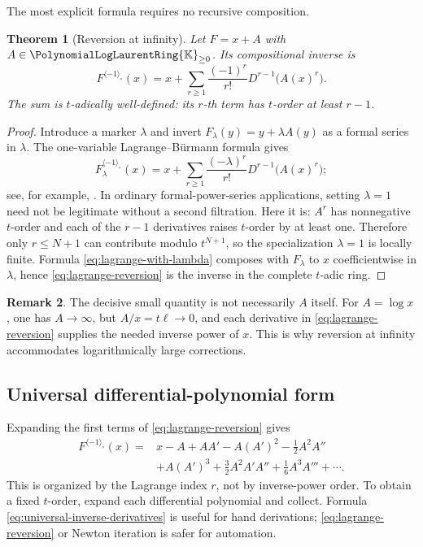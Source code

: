 \documentclass[11pt,oneside]{article}
\numberwithin{equation}{section}
\newtheorem{theorem}{Theorem}[section]
\theoremstyle{definition}
\newtheorem{remark}[theorem]{Remark}
\newcommand{\K}{\mathbb{K}}
\newcommand{\PL}{\PolynomialLogLaurentRing{\K}}
\newcommand{\rev}{\langle-1\rangle_{\circ}}
\begin{document}
The most explicit formula requires no recursive composition.

\begin{theorem}[Reversion at infinity]\label{thm:lagrange-reversion}
Let \(F=x+A\) with \(A\in{\PL}_{\ge0}\).  Its compositional inverse is
\begin{equation}\label{eq:lagrange-reversion}
\boxed{
  F^{\rev}(x)
  =x+\sum_{r\ge1}\frac{(-1)^r}{r!}
       D^{r-1}\bigl(A(x)^r\bigr).
}
\end{equation}
The sum is \(t\)-adically well-defined: its \(r\)-th term has
\(t\)-order at least \(r-1\).
\end{theorem}

\begin{proof}
Introduce a marker \(\lambda\) and invert
\(F_\lambda(y)=y+\lambda A(y)\) as a formal series in \(\lambda\).  The
one-variable Lagrange--B\"urmann formula gives
\begin{equation}\label{eq:lagrange-with-lambda}
  F_\lambda^{\rev}(x)
  =x+\sum_{r\ge1}\frac{(-\lambda)^r}{r!}
       D^{r-1}\bigl(A(x)^r\bigr);
\end{equation}
see, for example, \cite{GesselLagrange}.  In ordinary formal-power-series
applications, setting \(\lambda=1\) need not be legitimate without a second
filtration.  Here it is: \(A^r\) has nonnegative \(t\)-order and each of the
\(r-1\) derivatives raises \(t\)-order by at least one.  Therefore only
\(r\le N+1\) can contribute modulo \(t^{N+1}\), so the specialization
\(\lambda=1\) is locally finite.  Formula \eqref{eq:lagrange-with-lambda}
composes with \(F_\lambda\) to \(x\) coefficientwise in \(\lambda\), hence
\eqref{eq:lagrange-reversion} is the inverse in the complete \(t\)-adic ring.
\end{proof}

\begin{remark}
The decisive small quantity is not necessarily \(A\) itself.  For
\(A=\log x\), one has \(A\to\infty\), but \(A/x=t\ell\to0\), and each derivative
in \eqref{eq:lagrange-reversion} supplies the needed inverse power of \(x\).
This is why reversion at infinity accommodates logarithmically large
corrections.
\end{remark}

\subsection{Universal differential-polynomial form}

Expanding the first terms of \eqref{eq:lagrange-reversion} gives
\begin{align}
 F^{\rev}(x)={}&x-A+AA'
 -A(A')^2-\frac12A^2A''\nonumber\\
 &+A(A')^3+\frac32A^2A'A''+\frac16A^3A'''
 +\cdots.\label{eq:universal-inverse-derivatives}
\end{align}
This is organized by the Lagrange index \(r\), not by inverse-power order.  To
obtain a fixed \(t\)-order, expand each differential polynomial and collect.
Formula \eqref{eq:universal-inverse-derivatives} is useful for hand derivations;
\eqref{eq:lagrange-reversion} or Newton iteration is safer for automation.
\end{document}
